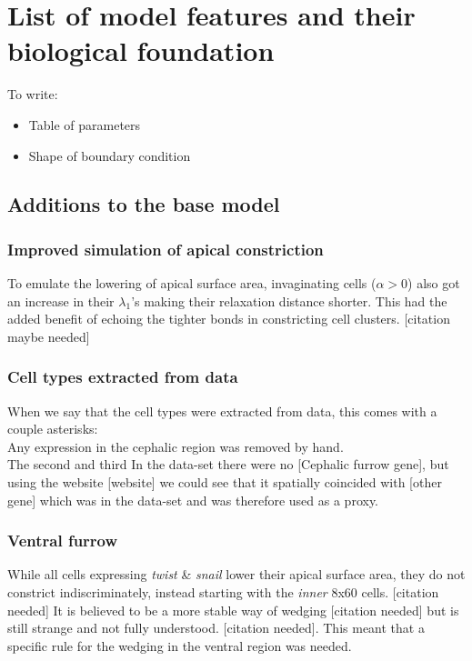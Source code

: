 \section{List of model features and their biological foundation}

To write:
\begin{itemize}
    \item Table of parameters
    \item Shape of boundary condition

\end{itemize}
\subsection{Additions to the base model}
\subsubsection{Improved simulation of apical constriction}
To emulate the lowering of apical surface area, invaginating cells ($\alpha > 0$) also got an increase in their $\lambda_1$'s making their relaxation distance shorter. This had the added benefit of echoing the tighter bonds in constricting cell clusters. [citation maybe needed]
\subsubsection{Cell types extracted from data}
When we say that the cell types were extracted from data, this comes with a couple asterisks:\\
Any expression in the cephalic region was removed by hand.\\
The second and third 
In the data-set there were no [Cephalic furrow gene], but using the website [website] we could see that it spatially coincided with [other gene] which was in the data-set and was therefore used as a proxy. 

\subsubsection{Ventral furrow}
While all cells expressing \textit{twist} \& \textit{snail} lower their apical surface area, they do not constrict indiscriminately, instead starting with the \textit{inner} 8x60 cells. [citation needed] It is believed to be a more stable way of wedging [citation needed] but is still strange and not fully understood. [citation needed]. This meant that a specific rule for the wedging in the ventral region was needed.

